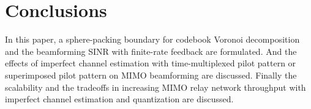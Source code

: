 \documentclass[10pt,fleqn, twocolumn]{IEEEtran}
\begin{document}
\section{Conclusions}
In this paper, a sphere-packing boundary for codebook Voronoi
decomposition and the beamforming SINR with finite-rate feedback
are formulated. And the effects of imperfect channel estimation
with time-multiplexed pilot pattern or superimposed pilot pattern
on MIMO beamforming are discussed. Finally the scalability and the
tradeoffs in increasing MIMO relay network throughput with
imperfect channel estimation and quantization are discussed.

\small


\end{document}
